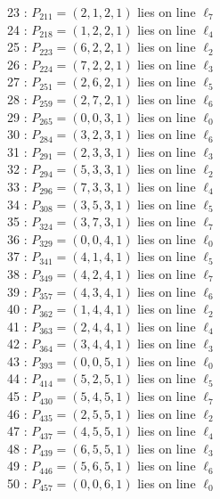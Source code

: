 \documentclass{article}
\begin{document}
{\begin{multicols}{2}
23 : $P_{211}=( 2, 1, 2, 1 )$ lies on line $\ell_{7}$\\
24 : $P_{218}=( 1, 2, 2, 1 )$ lies on line $\ell_{4}$\\
25 : $P_{223}=( 6, 2, 2, 1 )$ lies on line $\ell_{2}$\\
26 : $P_{224}=( 7, 2, 2, 1 )$ lies on line $\ell_{3}$\\
27 : $P_{251}=( 2, 6, 2, 1 )$ lies on line $\ell_{5}$\\
28 : $P_{259}=( 2, 7, 2, 1 )$ lies on line $\ell_{6}$\\
29 : $P_{265}=( 0, 0, 3, 1 )$ lies on line $\ell_{0}$\\
30 : $P_{284}=( 3, 2, 3, 1 )$ lies on line $\ell_{6}$\\
31 : $P_{291}=( 2, 3, 3, 1 )$ lies on line $\ell_{3}$\\
32 : $P_{294}=( 5, 3, 3, 1 )$ lies on line $\ell_{2}$\\
33 : $P_{296}=( 7, 3, 3, 1 )$ lies on line $\ell_{4}$\\
34 : $P_{308}=( 3, 5, 3, 1 )$ lies on line $\ell_{5}$\\
35 : $P_{324}=( 3, 7, 3, 1 )$ lies on line $\ell_{7}$\\
36 : $P_{329}=( 0, 0, 4, 1 )$ lies on line $\ell_{0}$\\
37 : $P_{341}=( 4, 1, 4, 1 )$ lies on line $\ell_{5}$\\
38 : $P_{349}=( 4, 2, 4, 1 )$ lies on line $\ell_{7}$\\
39 : $P_{357}=( 4, 3, 4, 1 )$ lies on line $\ell_{6}$\\
40 : $P_{362}=( 1, 4, 4, 1 )$ lies on line $\ell_{2}$\\
41 : $P_{363}=( 2, 4, 4, 1 )$ lies on line $\ell_{4}$\\
42 : $P_{364}=( 3, 4, 4, 1 )$ lies on line $\ell_{3}$\\
43 : $P_{393}=( 0, 0, 5, 1 )$ lies on line $\ell_{0}$\\
44 : $P_{414}=( 5, 2, 5, 1 )$ lies on line $\ell_{5}$\\
45 : $P_{430}=( 5, 4, 5, 1 )$ lies on line $\ell_{7}$\\
46 : $P_{435}=( 2, 5, 5, 1 )$ lies on line $\ell_{2}$\\
47 : $P_{437}=( 4, 5, 5, 1 )$ lies on line $\ell_{4}$\\
48 : $P_{439}=( 6, 5, 5, 1 )$ lies on line $\ell_{3}$\\
49 : $P_{446}=( 5, 6, 5, 1 )$ lies on line $\ell_{6}$\\
50 : $P_{457}=( 0, 0, 6, 1 )$ lies on line $\ell_{0}$\\

\end{multicols}}
\end{document}

